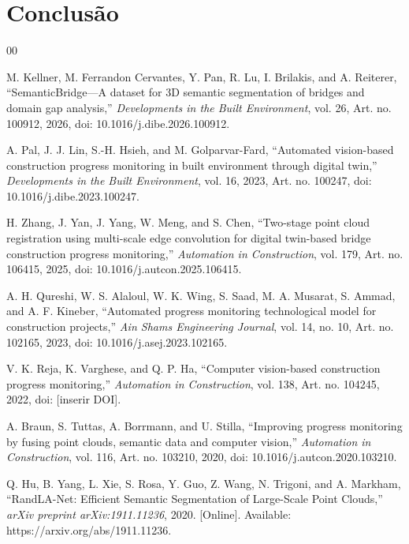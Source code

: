 \documentclass[conference]{IEEEtran}
\begin{document}
\section{Conclusão}



\begin{thebibliography}{00}

	M. Kellner, M. Ferrandon Cervantes, Y. Pan, R. Lu, I. Brilakis, and A. Reiterer,
	``SemanticBridge---A dataset for 3D semantic segmentation of bridges and domain gap analysis,''
	\textit{Developments in the Built Environment},
	vol. 26, Art. no. 100912, 2026,
	doi: 10.1016/j.dibe.2026.100912.
	
	A. Pal, J. J. Lin, S.-H. Hsieh, and M. Golparvar-Fard,
	``Automated vision-based construction progress monitoring in built environment through digital twin,''
	\textit{Developments in the Built Environment},
	vol. 16, 2023, Art. no. 100247,
	doi: 10.1016/j.dibe.2023.100247.
	
	H. Zhang, J. Yan, J. Yang, W. Meng, and S. Chen,
``Two-stage point cloud registration using multi-scale edge convolution for digital twin-based bridge construction progress monitoring,''
\textit{Automation in Construction},
vol. 179, Art. no. 106415, 2025,
doi: 10.1016/j.autcon.2025.106415.

	A. H. Qureshi, W. S. Alaloul, W. K. Wing, S. Saad, M. A. Musarat, S. Ammad, and A. F. Kineber,
``Automated progress monitoring technological model for construction projects,''
\textit{Ain Shams Engineering Journal},
vol. 14, no. 10, Art. no. 102165, 2023,
doi: 10.1016/j.asej.2023.102165.

V. K. Reja, K. Varghese, and Q. P. Ha,
``Computer vision-based construction progress monitoring,''
\textit{Automation in Construction},
vol. 138, Art. no. 104245, 2022,
doi: [inserir DOI].

A. Braun, S. Tuttas, A. Borrmann, and U. Stilla,
``Improving progress monitoring by fusing point clouds, semantic data and computer vision,''
\textit{Automation in Construction},
vol. 116, Art. no. 103210, 2020,
doi: 10.1016/j.autcon.2020.103210.

Q. Hu, B. Yang, L. Xie, S. Rosa, Y. Guo, Z. Wang, N. Trigoni, and A. Markham,
``RandLA-Net: Efficient Semantic Segmentation of Large-Scale Point Clouds,''
\textit{arXiv preprint arXiv:1911.11236}, 2020.
[Online]. Available: https://arxiv.org/abs/1911.11236.


\end{thebibliography}
\end{document}
